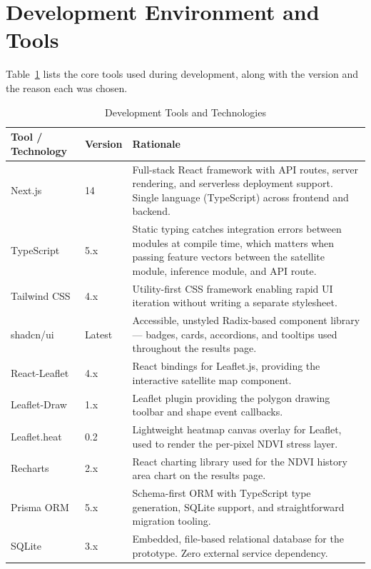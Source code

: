 \section{Development Environment and Tools}

Table~\ref{tab:devtools} lists the core tools used during development, along with the version and the reason each was chosen.

\begin{table}[H]
  \centering
  \caption{Development Tools and Technologies}
  \label{tab:devtools}
  \begin{tabularx}{\textwidth}{p{3.5cm} p{1.8cm} X}
    \toprule
    \textbf{Tool / Technology} & \textbf{Version} & \textbf{Rationale} \\
    \midrule
    Next.js              & 14         & Full-stack React framework with API routes, server rendering, and serverless deployment support. Single language (TypeScript) across frontend and backend. \\[4pt]
    TypeScript           & 5.x        & Static typing catches integration errors between modules at compile time, which matters when passing feature vectors between the satellite module, inference module, and API route. \\[4pt]
    Tailwind CSS         & 4.x        & Utility-first CSS framework enabling rapid UI iteration without writing a separate stylesheet. \\[4pt]
    shadcn/ui            & Latest     & Accessible, unstyled Radix-based component library — badges, cards, accordions, and tooltips used throughout the results page. \\[4pt]
    React-Leaflet        & 4.x        & React bindings for Leaflet.js, providing the interactive satellite map component. \\[4pt]
    Leaflet-Draw         & 1.x        & Leaflet plugin providing the polygon drawing toolbar and shape event callbacks. \\[4pt]
    Leaflet.heat         & 0.2        & Lightweight heatmap canvas overlay for Leaflet, used to render the per-pixel NDVI stress layer. \\[4pt]
    Recharts             & 2.x        & React charting library used for the NDVI history area chart on the results page. \\[4pt]
    Prisma ORM           & 5.x        & Schema-first ORM with TypeScript type generation, SQLite support, and straightforward migration tooling. \citep{prisma2023} \\[4pt]
    SQLite               & 3.x        & Embedded, file-based relational database for the prototype. Zero external service dependency. \\[4pt]

\end{tabularx}
\end{table}
